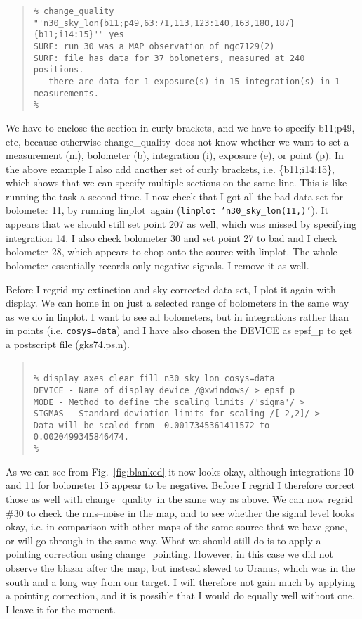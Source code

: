 \documentclass[twoside,11pt]{article}
\newenvironment{myquote}{\begin{quote}\begin{small}}{\end{small}\end{quote}}
\newcommand{\task}[1]{\textsf{#1}}
\newcommand{\param}[1]{\texttt{#1}}
\newcommand{\chgqual}{\xref{\task{change\_\-qua\-lity}}{sun216}{CHANGE_QUALITY}}
\newcommand{\chgpnt}{\xref{\task{change\_pointing}}{sun216}{CHANGE_POINTING}}
\newcommand{\display}{\xref{\task{display}}{sun95}{DISPLAY}}
\newcommand{\linplot}{\xref{\task{linplot}}{sun95}{LINPLOT}}
\newcommand{\xref}[3]{#1}
\begin{document}
\begin{myquote} \begin{verbatim}
% change_quality
"'n30_sky_lon{b11;p49,63:71,113,123:140,163,180,187}{b11;i14:15}'" yes
SURF: run 30 was a MAP observation of ngc7129(2)
SURF: file has data for 37 bolometers, measured at 240 positions.
 - there are data for 1 exposure(s) in 15 integration(s) in 1 measurements.
% 
\end{verbatim} \end{myquote}

We have to enclose the section in curly brackets, and we have to specify
b11;p49, etc, because otherwise \chgqual\ does not know whether we want to set
a measurement (m), bolometer (b), integration (i), exposure (e), or point
(p). In the above example I also add another set of curly brackets,
i.e. \{b11;i14:15\}, which shows that we can specify multiple sections on the
same line. This is like running the task a second time. I now check that I got
all the bad data set for bolometer 11, by running \linplot\ again
(\texttt{\linplot\ 'n30\_sky\_lon(11,)'}). It appears that we should still set
point 207 as well, which was missed by specifying integration 14.  I also
check bolometer 30 and set point 27 to bad and I check bolometer 28, which
appears to chop onto the source with \linplot. The whole bolometer essentially
records only negative signals.  I remove it as well.

Before I regrid my extinction and sky corrected data set, I plot it again with
\display. We can home in on just a selected range of bolometers in the same
way as we do in \linplot. I want to see all bolometers, but in integrations
rather than in points (i.e. \texttt{\param{cosys}=data}) and I have also
chosen the DEVICE as epsf\_p to get a postscript file (gks74.ps.n).

\begin{myquote} \begin{verbatim}

% display axes clear fill n30_sky_lon cosys=data
DEVICE - Name of display device /@xwindows/ > epsf_p
MODE - Method to define the scaling limits /'sigma'/ > 
SIGMAS - Standard-deviation limits for scaling /[-2,2]/ > 
Data will be scaled from -0.0017345361411572 to 0.0020499345846474.
% 
\end{verbatim} \end{myquote}

As we can see from Fig.\ \ref{fig:blanked} it now looks okay, although
integrations 10 and 11 for bolometer 15 appear to be negative. Before I regrid
I therefore correct those as well with \chgqual\ in the same way as above. We
can now regrid \#30 to check the rms--noise in the map, and to see whether the
signal level looks okay, i.e. in comparison with other maps of the same source
that we have gone, or will go through in the same way. What we should still do
is to apply a pointing correction using \chgpnt.  However, in this case we did
not observe the blazar after the map, but instead slewed to Uranus, which was
in the south and a long way from our target. I will therefore not gain much by
applying a pointing correction, and it is possible that I would do equally
well without one. I leave it for the moment.
\end{document}
